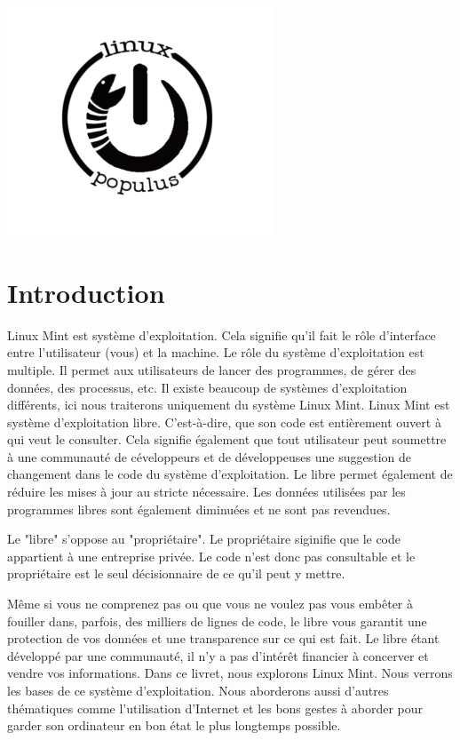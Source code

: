 \documentclass[12pt]{book}
\begin{document}
	\vfill
	\begin{center}
		\includegraphics[scale=.5]{include/linuxpop.png}
	\end{center}
	\vfill

\newpage
\tableofcontents

\chapter{Introduction}
Linux Mint est système d'exploitation.
Cela signifie qu'il fait le rôle d'interface entre l'utilisateur (vous) et la machine.
Le rôle du système d'exploitation est multiple.
Il permet aux utilisateurs de lancer des programmes, de gérer des données, des processus, etc.
Il existe beaucoup de systèmes d'exploitation différents, ici nous traiterons uniquement du système Linux Mint.
Linux Mint est système d'exploitation libre.
C'est-à-dire, que son code est entièrement ouvert à qui veut le consulter.
Cela signifie également que tout utilisateur peut soumettre à une communauté de céveloppeurs et de développeuses une suggestion de changement dans le code du système d'exploitation.
Le libre permet également de réduire les mises à jour au stricte nécessaire.
Les données utilisées par les programmes libres sont également diminuées et ne sont pas revendues.\par
Le "libre" s'oppose au "propriétaire".
Le propriétaire siginifie que le code appartient à une entreprise privée.
Le code n'est donc pas consultable et le propriétaire est le seul décisionnaire de ce qu'il peut y mettre.\par
Même si vous ne comprenez pas ou que vous ne voulez pas vous embêter à fouiller dans, parfois, des milliers de lignes de code, le libre vous garantit une protection de vos données et une transparence sur ce qui est fait.
Le libre étant développé par une communauté, il n'y a pas d'intérêt financier à concerver et vendre vos informations.
Dans ce livret, nous explorons Linux Mint.
Nous verrons les bases de ce système d'exploitation.
Nous aborderons aussi d'autres thématiques comme l'utilisation d'Internet et les bons gestes à aborder pour garder son ordinateur en bon état le plus longtemps possible.
\end{document}
